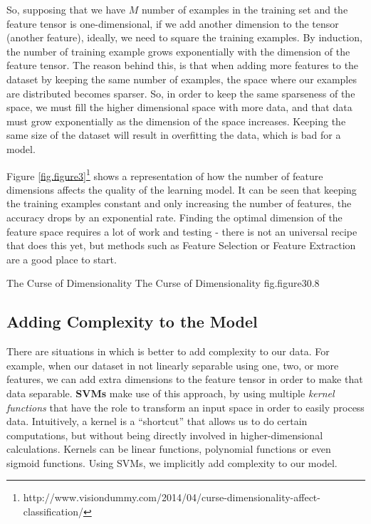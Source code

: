 So, supposing that we have $M$ number of examples in the training set and 
the feature tensor is one-dimensional, if we add another dimension to the 
tensor (another feature), ideally, we need to square the training examples. 
By induction, the number of training example grows exponentially with the 
dimension of the feature tensor. The reason behind this, is that when adding 
more features to the dataset by keeping the same number of examples, the 
space where our examples are distributed becomes sparser. So, in order to 
keep the same sparseness of the space, we must fill the higher dimensional 
space with more data, and that data must grow exponentially as the dimension 
of the space increases. Keeping the same size of the dataset will result in 
overfitting the data, which is bad for a model.

Figure \ref{fig.figure3}\footnote{http://www.visiondummy.com/2014/04/curse-dimensionality-affect-classification/} shows a representation of how the number of feature dimensions 
affects the quality of the learning model. It can be seen that keeping the 
training examples constant and only increasing the number of features, the 
accuracy drops by an exponential rate. Finding the optimal dimension of the 
feature space requires a lot of work and testing - there is not an universal 
recipe that does this yet, but methods such as Feature Selection or Feature 
Extraction are a good place to start. 

%
    {The Curse of Dimensionality}%
    {The Curse of Dimensionality}%
    {fig.figure3}{0.8}

\subsection{Adding Complexity to the Model}

There are situations in which is better to add complexity to our data. 
For example, when our dataset in not linearly separable using one, two, or more 
features, we can add extra dimensions to the feature tensor in order to make 
that data separable. {\bf SVMs} make use of this approach, by using multiple 
{\it kernel functions} that have the role to transform an input space in order 
to easily process data. Intuitively, a kernel is a ``shortcut'' that allows us 
to do certain computations, but without being directly involved in higher-dimensional 
calculations. Kernels can be linear functions, polynomial functions or even sigmoid 
functions. Using SVMs, we implicitly add complexity to our model.

